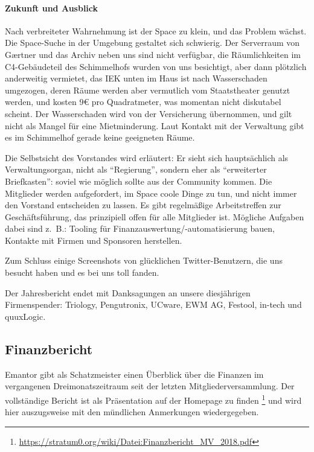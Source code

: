 \documentclass{s0minutes}
\begin{document}
\paragraph{Zukunft und Ausblick}

Nach verbreiteter Wahrnehmung ist der Space zu klein, und das Problem wächst.
Die Space-Suche in der Umgebung gestaltet sich schwierig. Der Serverraum von
G\ae{}rtner und das Archiv neben uns sind nicht verfügbar, die Räumlichkeiten im
C4-Gebäudeteil des Schimmelhofs wurden von uns besichtigt, aber dann plötzlich
anderweitig vermietet, das IEK unten im Haus ist nach Wasserschaden umgezogen,
deren Räume werden aber vermutlich vom Staatstheater genutzt werden, und kosten
9€ pro Quadratmeter, was momentan nicht diskutabel scheint. Der Wasserschaden
wird von der Versicherung übernommen, und gilt nicht als Mangel für eine
Mietminderung. Laut Kontakt mit der Verwaltung gibt es im Schimmelhof gerade
keine geeigneten Räume.

Die Selbstsicht des Vorstandes wird erläutert: Er sieht sich hauptsächlich als
Verwaltungsorgan, nicht als "`Regierung"', sondern eher als "`erweiterter
Briefkasten"': soviel wie möglich sollte aus der Community kommen.  Die
Mitglieder werden aufgefordert, im Space coole Dinge zu tun, und nicht immer den
Vorstand entscheiden zu lassen.  Es gibt regelmäßige Arbeitstreffen zur
Geschäftsführung, das prinzipiell offen für alle Mitglieder ist. Mögliche
Aufgaben dabei sind z.~B.: Tooling für Finanzauswertung/-automatisierung bauen,
Kontakte mit Firmen und Sponsoren herstellen.

Zum Schluss einige Screenshots von glücklichen Twitter-Benutzern, die uns
besucht haben und es bei uns toll fanden.

Der Jahresbericht endet mit Danksagungen an unsere diesjährigen Firmenspender:
Triology, Pengutronix, UCware, EWM AG, Festool, in-tech und quuxLogic.


\subsection{Finanzbericht}

Emantor gibt als Schatzmeister einen Überblick über die Finanzen im
vergangenen Dreimonatszeitraum seit der letzten Mitgliederversammlung. Der
vollständige Bericht ist als Präsentation auf der Homepage zu finden%
\footnote{\url{https://stratum0.org/wiki/Datei:Finanzbericht_MV_2018.pdf}}
und wird hier auszugsweise mit den mündlichen Anmerkungen wiedergegeben.
\end{document}
